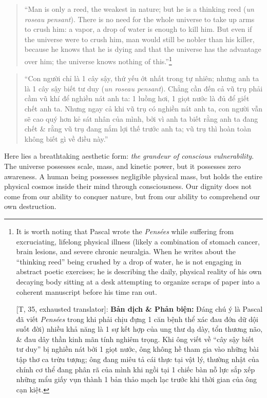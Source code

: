 \documentclass[11pt]{article}
\begin{document}
\begin{quote}
``Man is only a reed, the weakest in nature; but he is a thinking reed (\textit{un roseau pensant}). There is no need for the whole universe to take up arms to crush him: a vapor, a drop of water is enough to kill him. But even if the universe were to crush him, man would still be nobler than his killer, because he knows that he is dying and that the universe has the advantage over him; the universe knows nothing of this.''\footnote{It is worth noting that Pascal wrote the \textit{Pens\'ees} while suffering from excruciating, lifelong physical illness (likely a combination of stomach cancer, brain lesions, and severe chronic neuralgia. When he writes about the ``thinking reed'' being crushed by a drop of water, he is not engaging in abstract poetic exercises; he is describing the daily, physical reality of his own decaying body sitting at a desk attempting to organize scraps of paper into a coherent manuscript before his time ran out.
	
	\textsf{[T, 35, exhausted translator]:} \textbf{Bản dịch \& Phản biện:} Đáng chú ý là Pascal đã viết \textit{Pens\'ees} trong khi phải chịu đựng 1 căn bệnh thể xác đau đớn dữ dội suốt đời) nhiều khả năng là 1 sự kết hợp của ung thư dạ dày, tổn thương não, \& đau dây thần kinh mãn tính nghiêm trọng. Khi ông viết về ``cây sậy biết tư duy'' bị nghiền nát bởi 1 giọt nước, ông không hề tham gia vào những bài tập thơ ca trừu tượng; ông đang miêu tả cái thực tại vật lý, thường nhật của chính cơ thể đang phân rã của mình khi ngồi tại 1 chiếc bàn nỗ lực sắp xếp những mẩu giấy vụn thành 1 bản thảo mạch lạc trước khi thời gian của ông cạn kiệt.}
\end{quote}

\begin{quote}
``Con người chỉ là 1 cây sậy, thứ yếu ớt nhất trong tự nhiên; nhưng anh ta là 1 cây sậy biết tư duy (\textit{un roseau pensant}). Chẳng cần đến cả vũ trụ phải cầm vũ khí để nghiền nát anh ta: 1 luồng hơi, 1 giọt nước là đủ để giết chết anh ta. Nhưng ngay cả khi vũ trụ có nghiền nát anh ta, con người vẫn sẽ cao quý hơn kẻ sát nhân của mình, bởi vì anh ta biết rằng anh ta đang chết \& rằng vũ trụ đang nắm lợi thế trước anh ta; vũ trụ thì hoàn toàn không biết gì về điều này.''
\end{quote}

Here lies a breathtaking aesthetic form: \emph{the grandeur of conscious vulnerability}. The universe possesses scale, mass, and kinetic power, but it possesses zero awareness. A human being possesses negligible physical mass, but holds the entire physical cosmos inside their mind through consciousness. Our dignity does not come from our ability to conquer nature, but from our ability to comprehend our own destruction.
\end{document}
